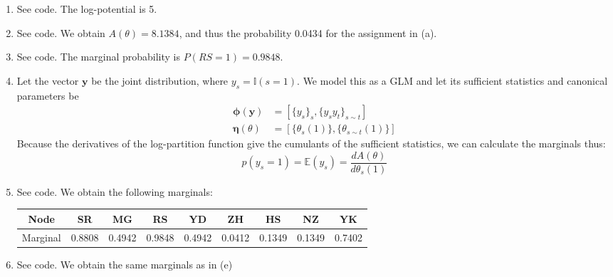 \documentclass[submit]{harvardml}
\theoremstyle{plain}
\begin{document}
\begin{enumerate}[label=(\alph*)]
	\item See code. The log-potential is 5.
	
	\item See code. We obtain $A(\theta) = 8.1384$, and thus the probability 0.0434 for the assignment in (a).
	
	\item See code. The marginal probability is $P(RS = 1) = 0.9848$.
	
	\item Let the vector $\bm{y}$ be the joint distribution, where $y_s = \mathbb{I}(s = 1)$. We model this as a GLM and let its sufficient statistics and canonical parameters be
	\begin{align*}
	\bm{\phi}(\bm{y}) &= [\{y_s\}_s, \{y_s y_t\}_{s\sim t}] \\
	\bm{\eta}(\theta) &= [\{\theta_s(1)\}, \{\theta_{s\sim t}(1)\}]
	\end{align*}
	Because the derivatives of the log-partition function give the cumulants of the sufficient statistics, we can calculate the marginals thus:
	\[
	p(y_s = 1) = \mathbb{E}(y_s) = \frac{dA(\theta)}{d\theta_s(1)}
	\] 
	
	\item See code. We obtain the following marginals:
	\begin{center}
		\begin{tabular}{c||cccccccc}
			Node & SR & MG & RS & YD & ZH & HS & NZ & YK \\ \hline
			Marginal & 0.8808 & 0.4942 & 0.9848 & 0.4942 & 0.0412 & 0.1349 & 0.1349 & 0.7402 
		\end{tabular}
	\end{center}

	\item See code. We obtain the same marginals as in (e)
	

\end{enumerate}
\end{document}
